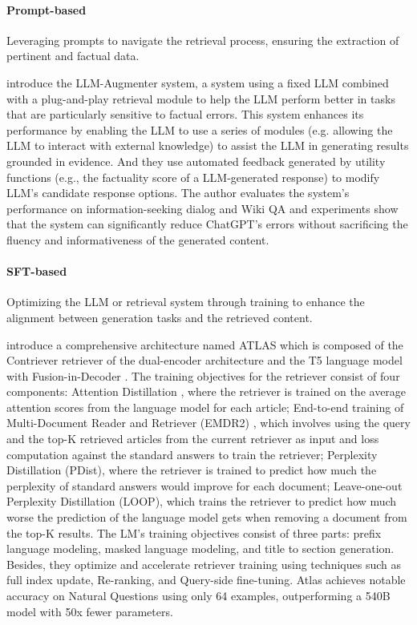 \paragraph{\textbf{Prompt-based}}
Leveraging prompts to navigate the retrieval process, ensuring the extraction of pertinent and factual data.

\citet{peng2023check} introduce the LLM-Augmenter system, a system using a fixed LLM combined with a plug-and-play retrieval module to help the LLM perform better in tasks that are particularly sensitive to factual errors. This system enhances its performance by enabling the LLM to use a series of modules (e.g. allowing the LLM to interact with external knowledge) to assist the LLM in generating results grounded in evidence. And they use automated feedback generated by utility functions (e.g., the factuality score of a LLM-generated response) to modify LLM's candidate response options. The author evaluates the system's performance on information-seeking dialog \citep{galley2019grounded} and Wiki QA \citep{OTT-QA} and experiments show that the system can significantly reduce ChatGPT's errors without sacrificing the fluency and informativeness of the generated content.

\paragraph{\textbf{SFT-based}}
Optimizing the LLM or retrieval system through training to enhance the alignment between generation tasks and the retrieved content.

\citet{Atlas} introduce a comprehensive architecture named ATLAS which is composed of the Contriever \citep{contriever} retriever of the dual-encoder architecture and the T5 \citep{t5} language model with Fusion-in-Decoder \citep{Fusion-in-Decoder}. The training objectives for the retriever consist of four components: Attention Distillation \citep{izacard_attention_dist}, where the retriever is trained on the average attention scores from the language model for each article; End-to-end training of Multi-Document Reader and Retriever (EMDR2) \citep{EMDR2}, which involves using the query and the top-K retrieved articles from the current retriever as input and loss computation against the standard answers to train the retriever; Perplexity Distillation (PDist), where the retriever is trained to predict how much the perplexity of standard answers would improve for each document; Leave-one-out Perplexity Distillation (LOOP), which trains the retriever to predict how much worse the prediction of the language model gets when removing a document from the top-K results. The LM's training objectives consist of three parts: prefix language modeling, masked language modeling, and title to section generation. Besides, they optimize and accelerate retriever training using techniques such as full index update, Re-ranking, and Query-side fine-tuning. Atlas achieves notable accuracy on Natural Questions using only 64 examples, outperforming a 540B model with 50x fewer parameters.

